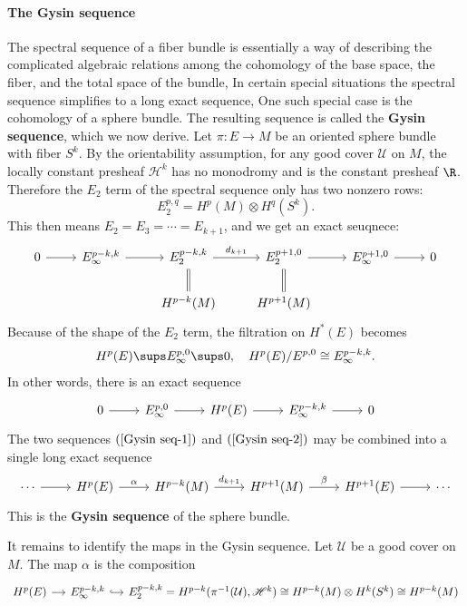\paragraph{The Gysin sequence}
The spectral sequence of a fiber bundle is essentially a way of describing the complicated algebraic relations among the cohomology of the base space, the fiber, and 
the total space of the bundle, In certain special situations the spectral sequence simplifies to a long exact sequence, One such special case is the cohomology of a 
sphere bundle. The resulting sequence is called the \textbf{Gysin sequence}, which we now derive.
Let $\pi:E\to M$ be an oriented sphere bundle with fiber $S^k$. By the orientability assumption, for any good cover $\mathcal{U}$ on $M$, the locally constant presheaf 
$\mathscr{H}^k$ has no monodromy and is the constant presheaf $\R$. Therefore the $E_2$ term of the spectral sequence only has two nonzero rows:
\[E_2^{p,q}=H^p(M)\otimes H^q(S^k).\]
This then means $E_2=E_3=\cdots=E_{k+1}$, and we get an exact seuqnece:
\begin{equation}\label{Gysin seq-1}
\begin{tikzcd}
0\ar[r]&E_{\infty}^{p-k,k}\ar[r]&E_2^{p-k,k}\ar[r,"d_{k+1}"]&E_2^{p+1,0}\ar[r]&E_{\infty}^{p+1,0}\ar[r]&0\\
&&H^{p-k}(M)\ar[u,equal]&H^{p+1}(M)\ar[u,equal]&&
\end{tikzcd}
\end{equation}
Because of the shape of the $E_2$ term, the filtration on $H^*(E)$ becomes
\[H^p(E)\sups E^{p,0}_{\infty}\sups 0,\quad H^p(E)/E^{p,0}\cong E^{p-k,k}_{\infty}.\]
In other words, there is an exact sequence
\begin{equation}\label{Gysin seq-2}
\begin{tikzcd}
0\ar[r]&E^{p,0}_{\infty}\ar[r]&H^p(E)\ar[r]&E_\infty^{p-k,k}\ar[r]&0
\end{tikzcd}
\end{equation}
The two sequences $(\ref{Gysin seq-1})$ and $(\ref{Gysin seq-2})$ may be combined into a single long exact sequence
\[\begin{tikzcd}
\cdots\ar[r]&H^p(E)\ar[r,"\alpha"]&H^{p-k}(M)\ar[r,"d_{k+1}"]&H^{p+1}(M)\ar[r,"\beta"]&H^{p+1}(E)\ar[r]&\cdots
\end{tikzcd}\]
This is the \textbf{Gysin sequence} of the sphere bundle.\par
It remains to identify the maps in the Gysin sequence. Let $\mathcal{U}$ be a good cover on $M$. The map $\alpha$ is the composition
\[\begin{tikzcd}[column sep=1.2em]
H^p(E)\ar[r]&E_{\infty}^{p-k,k}\ar[r,hook]&E_2^{p-k,k}=H^{p-k}(\pi^{-1}(\mathcal{U}),\mathscr{H}^k)\cong H^{p-k}(M)\otimes H^k(S^k)\cong H^{p-k}(M)
\end{tikzcd}\]
